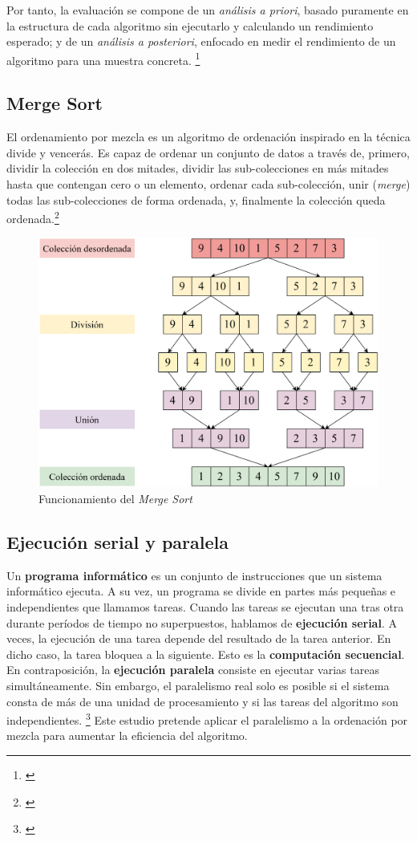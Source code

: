 \documentclass[titlepage]{article}
\begin{document}
Por tanto, la evaluación se compone de un \textit{análisis a priori}, basado puramente en la estructura de cada algoritmo sin ejecutarlo y calculando un rendimiento esperado; y de un \textit{análisis a posteriori}, enfocado en medir el rendimiento de un algoritmo para una muestra concreta. \footnote{\cite{shoolini2025}}



\subsection{Merge Sort} %
El ordenamiento por mezcla es un algoritmo de ordenación inspirado en la técnica divide y vencerás. Es capaz de ordenar un conjunto de datos a través de, primero, dividir la colección en dos mitades, dividir las sub-colecciones en más mitades hasta que contengan cero o un elemento, ordenar cada sub-colección, unir (\textit{merge}) todas las sub-colecciones de forma ordenada, y, finalmente la colección queda ordenada.\footnote{\cite{skiena-2008}}



\begin{figure}[h]
    \centering
    \captionsetup{justification=centering}
    \includegraphics[width=0.50\linewidth]{Diagrames/arbolMS.png}
    \caption{Funcionamiento del \textit{Merge Sort}}
    \label{fig:arbolMS}
\end{figure}

\subsection{Ejecución serial y paralela} %
Un \textbf{programa informático} es un conjunto de instrucciones que un sistema informático ejecuta. A su vez, un programa se divide en partes más pequeñas e independientes que llamamos tareas. Cuando las tareas se ejecutan una tras otra durante períodos de tiempo no superpuestos, hablamos de \textbf{ejecución serial}. A veces, la ejecución de una tarea depende del resultado de la tarea anterior. En dicho caso, la tarea bloquea a la siguiente. Esto es la \textbf{computación secuencial}. En contraposición, la \textbf{ejecución paralela} consiste en ejecutar varias tareas simultáneamente. Sin embargo, el paralelismo real solo es posible si el sistema consta de más de una unidad de procesamiento y si las tareas del algoritmo son independientes. \footnote{\cite{bobrov-2023}} Este estudio pretende aplicar el paralelismo a la ordenación por mezcla para aumentar la eficiencia del algoritmo.
\end{document}
